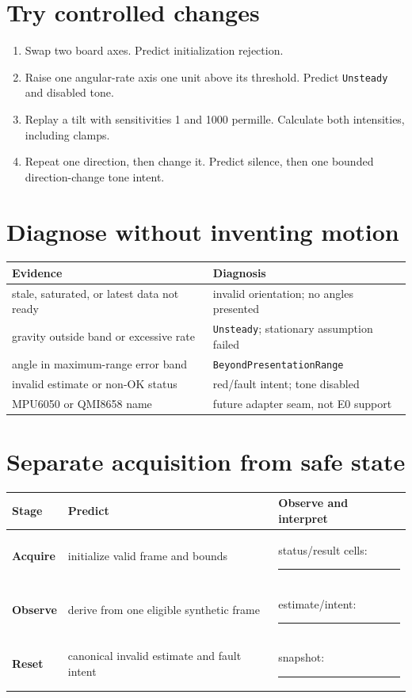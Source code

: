 \documentclass[11pt]{article}
\newcommand{\blankline}{\rule{0.86in}{0.4pt}}
\begin{document}
\section{Try controlled changes}
\begin{enumerate}
 \item Swap two board axes. Predict initialization rejection.
 \item Raise one angular-rate axis one unit above its threshold. Predict
       \texttt{Unsteady} and disabled tone.
 \item Replay a tilt with sensitivities 1 and 1000 permille. Calculate both
       intensities, including clamps.
 \item Repeat one direction, then change it. Predict silence, then one bounded
       direction-change tone intent.
\end{enumerate}

\newpage
\small
\section{Diagnose without inventing motion}
\begin{tabularx}{\linewidth}{@{}l X@{}}
\toprule
Evidence & Diagnosis\\
\midrule
stale, saturated, or latest data not ready & invalid orientation; no angles presented\\
gravity outside band or excessive rate & \texttt{Unsteady}; stationary assumption failed\\
angle in maximum-range error band & \texttt{BeyondPresentationRange}\\
invalid estimate or non-OK status & red/fault intent; tone disabled\\
MPU6050 or QMI8658 name & future adapter seam, not E0 support\\
\bottomrule
\end{tabularx}

\section{Separate acquisition from safe state}
\begin{tabularx}{\linewidth}{@{}>{\bfseries}l X X@{}}
\toprule
Stage & Predict & Observe and interpret\\
\midrule
Acquire & initialize valid frame and bounds & status/result cells:
\blankline\\[9pt]
Observe & derive from one eligible synthetic frame & estimate/intent:
\blankline\\[9pt]
Reset & canonical invalid estimate and fault intent & snapshot:
\blankline\\
\bottomrule
\end{tabularx}
\end{document}
